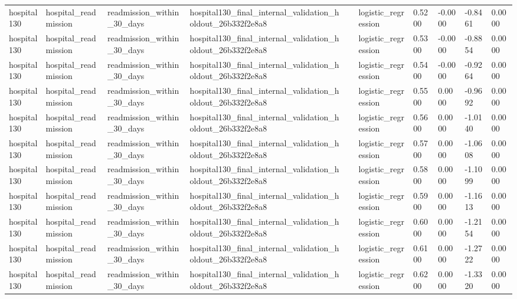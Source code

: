 \begin{tabular}{llllllllll}
hospital130 & hospital\_readmission & readmission\_within\_30\_days & hospital130\_final\_internal\_validation\_holdout\_26b332f2e8a8 &  & logistic\_regression & 0.5200 & -0.0000 & -0.8461 & 0.0000 \\
hospital130 & hospital\_readmission & readmission\_within\_30\_days & hospital130\_final\_internal\_validation\_holdout\_26b332f2e8a8 &  & logistic\_regression & 0.5300 & -0.0000 & -0.8854 & 0.0000 \\
hospital130 & hospital\_readmission & readmission\_within\_30\_days & hospital130\_final\_internal\_validation\_holdout\_26b332f2e8a8 &  & logistic\_regression & 0.5400 & -0.0000 & -0.9264 & 0.0000 \\
hospital130 & hospital\_readmission & readmission\_within\_30\_days & hospital130\_final\_internal\_validation\_holdout\_26b332f2e8a8 &  & logistic\_regression & 0.5500 & 0.0000 & -0.9692 & 0.0000 \\
hospital130 & hospital\_readmission & readmission\_within\_30\_days & hospital130\_final\_internal\_validation\_holdout\_26b332f2e8a8 &  & logistic\_regression & 0.5600 & 0.0000 & -1.0140 & 0.0000 \\
hospital130 & hospital\_readmission & readmission\_within\_30\_days & hospital130\_final\_internal\_validation\_holdout\_26b332f2e8a8 &  & logistic\_regression & 0.5700 & 0.0000 & -1.0608 & 0.0000 \\
hospital130 & hospital\_readmission & readmission\_within\_30\_days & hospital130\_final\_internal\_validation\_holdout\_26b332f2e8a8 &  & logistic\_regression & 0.5800 & 0.0000 & -1.1099 & 0.0000 \\
hospital130 & hospital\_readmission & readmission\_within\_30\_days & hospital130\_final\_internal\_validation\_holdout\_26b332f2e8a8 &  & logistic\_regression & 0.5900 & 0.0000 & -1.1613 & 0.0000 \\
hospital130 & hospital\_readmission & readmission\_within\_30\_days & hospital130\_final\_internal\_validation\_holdout\_26b332f2e8a8 &  & logistic\_regression & 0.6000 & 0.0000 & -1.2154 & 0.0000 \\
hospital130 & hospital\_readmission & readmission\_within\_30\_days & hospital130\_final\_internal\_validation\_holdout\_26b332f2e8a8 &  & logistic\_regression & 0.6100 & 0.0000 & -1.2722 & 0.0000 \\
hospital130 & hospital\_readmission & readmission\_within\_30\_days & hospital130\_final\_internal\_validation\_holdout\_26b332f2e8a8 &  & logistic\_regression & 0.6200 & 0.0000 & -1.3320 & 0.0000 \\

\end{tabular}
